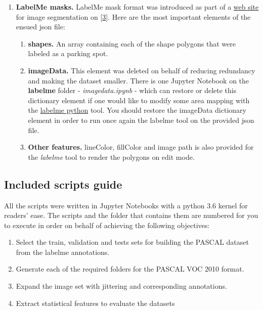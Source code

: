\documentclass[]{article}
\providecommand{\tightlist}{%
  \setlength{\itemsep}{0pt}\setlength{\parskip}{0pt}}
\theoremstyle{definition}
\theoremstyle{definition}
\theoremstyle{definition}
\theoremstyle{remark}
\begin{document}
\begin{enumerate}
\def\labelenumi{\arabic{enumi}.}
\setcounter{enumi}{1}
\tightlist
\item
  \textbf{LabelMe masks.} LabelMe mask format was introduced as part of
  a \href{http://labelme.csail.mit.edu/Release3.0/}{web site} for image
  segmentation on
  {[}\protect\hyperlink{ref-DBLP:journalsux2fcorrux2fabs-1210-3448}{3}{]}.
  Here are the most important elements of the ensued json file:

  \begin{enumerate}
  \def\labelenumii{\arabic{enumii}.}
  \tightlist
  \item
    \textbf{shapes.} An array containing each of the shape polygons that
    were labeled as a parking spot.
  \item
    \textbf{imageData.} This element was deleted on behalf of reducing
    redundancy and making the dataset smaller. There is one Jupyter
    Notebook on the \textbf{labelme} folder - \emph{imagedata.ipynb} -
    which can restore or delete this dictionary element if one would
    like to modify some area mapping with the
    \href{https://github.com/wkentaro/labelme}{labelme python} tool. You
    should restore the imageData dictionary element in order to run once
    again the labelme tool on the provided json file.
  \item
    \textbf{Other features.} lineColor, fillColor and image path is also
    provided for the \emph{labelme} tool to render the polygons on edit
    mode.
  \end{enumerate}
\end{enumerate}

\hypertarget{included-scripts-guide}{%
\subsection{Included scripts guide}\label{included-scripts-guide}}

All the scripts were written in Jupyter Notebooks with a python 3.6
kernel for readers' ease. The scripts and the folder that contains them
are numbered for you to execute in order on behalf of achieving the
following objectives:

\begin{enumerate}
\def\labelenumi{\arabic{enumi}.}
\tightlist
\item
  Select the train, validation and tests sets for building the PASCAL
  dataset from the labelme annotations.
\item
  Generate each of the required folders for the PASCAL VOC 2010 format.
\item
  Expand the image set with jittering and corresponding annotations.
\item
  Extract statistical features to evaluate the datasets
\end{enumerate}
\end{document}
